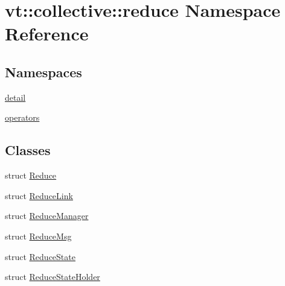 \hypertarget{namespacevt_1_1collective_1_1reduce}{}\section{vt\+:\+:collective\+:\+:reduce Namespace Reference}
\label{namespacevt_1_1collective_1_1reduce}
\subsection*{Namespaces}
\begin{DoxyCompactItemize}
\item 
 \hyperlink{namespacevt_1_1collective_1_1reduce_1_1detail}{detail}
\item 
 \hyperlink{namespacevt_1_1collective_1_1reduce_1_1operators}{operators}
\end{DoxyCompactItemize}
\subsection*{Classes}
\begin{DoxyCompactItemize}
\item 
struct \hyperlink{structvt_1_1collective_1_1reduce_1_1_reduce}{Reduce}
\item 
struct \hyperlink{structvt_1_1collective_1_1reduce_1_1_reduce_link}{Reduce\+Link}
\item 
struct \hyperlink{structvt_1_1collective_1_1reduce_1_1_reduce_manager}{Reduce\+Manager}
\item 
struct \hyperlink{structvt_1_1collective_1_1reduce_1_1_reduce_msg}{Reduce\+Msg}
\item 
struct \hyperlink{structvt_1_1collective_1_1reduce_1_1_reduce_state}{Reduce\+State}
\item 
struct \hyperlink{structvt_1_1collective_1_1reduce_1_1_reduce_state_holder}{Reduce\+State\+Holder}
\end{DoxyCompactItemize}
